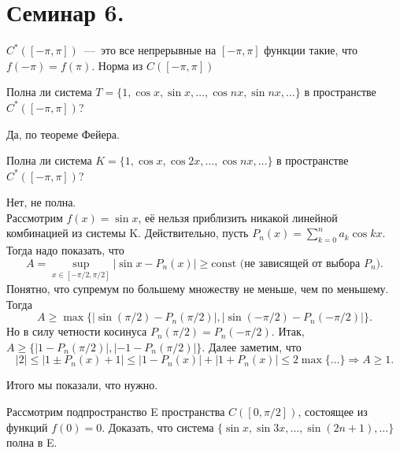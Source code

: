 \section{Семинар 6.}

\begin{reminder}
    $C^*([-\pi, \pi])$~---~это все непрерывные на $[-\pi, \pi]$ функции такие, что $f(-\pi) = f(\pi)$. Норма из $C([-\pi, \pi])$
\end{reminder}

\begin{problem}
    Полна ли система $T = \{1, \cos{x}, \sin{x}, \ldots, \cos{nx}, \sin{nx}, \ldots\}$ в пространстве $C^*([-\pi, \pi])$?
\end{problem}

\begin{solution}
    Да, по теореме Фейера.
\end{solution}

\begin{problem}
    Полна ли система $K = \{1, \cos{x}, \cos{2x}, \ldots, \cos{nx}, \ldots\}$ в пространстве $C^*([-\pi, \pi])$?
\end{problem}

\begin{solution}
    Нет, не полна.\\
    Рассмотрим $f(x) = \sin{x}$, её нельзя приблизить никакой линейной комбинацией из системы K. Действительно, пусть $P_n (x) = \sum_{k = 0}^n a_k \cos{kx}$. Тогда надо показать, что
    $$A = \sup_{x \in [-\pi / 2, \pi / 2]}|\sin{x} - P_n(x)| \geq \text{const (не зависящей от выбора } P_n).$$
    Понятно, что супремум по большему множеству не меньше, чем по меньшему. Тогда $$A \geq \max\{|\sin{(\pi / 2)} - P_n(\pi / 2)|, |\sin{(-\pi / 2)} - P_n(-\pi / 2)|\}.$$
    Но в силу четности косинуса $P_n(\pi / 2) = P_n(-\pi / 2).$ Итак, $A \geq \{ |1 - P_n(\pi / 2)|, |-1 - P_n(\pi / 2)| \}$.
    Далее заметим, что
    $$|2| \leq |1 \pm P_n (x) + 1| \leq |1 - P_n (x)| + |1 + P_n (x)| \leq 2 \max\{\ldots\} \Longrightarrow A \geq 1.$$

    Итого мы показали, что нужно.
\end{solution}

\begin{problem}
    Рассмотрим подпространство E пространства $C([0, \pi / 2])$, состоящее из функций $f(0) = 0$. Доказать, что система $\{ \sin{x}, \sin{3x}, \ldots, \sin{(2n + 1), \ldots\}}$ полна в E.
\end{problem}

